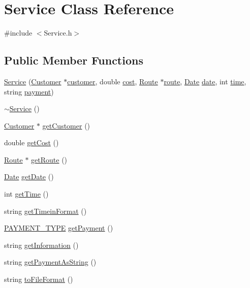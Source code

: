 \hypertarget{classService}{}\section{Service Class Reference}
\label{classService}


{\ttfamily \#include $<$Service.\+h$>$}

\subsection*{Public Member Functions}
\begin{DoxyCompactItemize}
\item 
\hyperlink{classService_a95b72be1a13715eda67acd99698ca0b4}{Service} (\hyperlink{classCustomer}{Customer} $\ast$\hyperlink{classService_a1dbb66a7a35562c9f4b7f1654c286d75}{customer}, double \hyperlink{classService_a2ce3309e0dff48b5fe242512df62784b}{cost}, \hyperlink{classRoute}{Route} $\ast$\hyperlink{classService_a3059a95085ce11e13a69ff19bc919f9a}{route}, \hyperlink{classDate}{Date} \hyperlink{classService_a00e1fb44faf15d76b7633b888780baeb}{date}, int \hyperlink{classService_ad48b41e25edbf42e8f0a0314adc8de4e}{time}, string \hyperlink{classService_a832536bb266da871d50d14226bba3ac0}{payment})
\item 
\hyperlink{classService_af6c3577b59652ac817d1d76aaccee904}{$\sim$\+Service} ()
\item 
\hyperlink{classCustomer}{Customer} $\ast$ \hyperlink{classService_a8f1201be847de0e1209c6dbc6e31b169}{get\+Customer} ()
\item 
double \hyperlink{classService_aba6ad9ce7b18fd9b9317166d34e74332}{get\+Cost} ()
\item 
\hyperlink{classRoute}{Route} $\ast$ \hyperlink{classService_a5c8aedeb788fac846e5862f7c4af9853}{get\+Route} ()
\item 
\hyperlink{classDate}{Date} \hyperlink{classService_af0a4561b2506893b9026ca31afef179a}{get\+Date} ()
\item 
int \hyperlink{classService_a10995791b3188543e2f96c820717a17c}{get\+Time} ()
\item 
string \hyperlink{classService_aa0a732dc04ba4ec18709575f1dcdfee5}{get\+Timein\+Format} ()
\item 
\hyperlink{Service_8h_a484d0c1796736fcbe8a3a730617b663f}{P\+A\+Y\+M\+E\+N\+T\+\_\+\+T\+Y\+PE} \hyperlink{classService_a83ce29e76b859a6feb292f4f39661eaa}{get\+Payment} ()
\item 
string \hyperlink{classService_a8c484a24407d965fec9d9a292d58cefb}{get\+Information} ()
\item 
string \hyperlink{classService_a029d5a0362c6bca5cd6c8dd1c49f9f44}{get\+Payment\+As\+String} ()
\item 
string \hyperlink{classService_a4b8752741b37817a03bfc1e756174550}{to\+File\+Format} ()
\end{DoxyCompactItemize}
